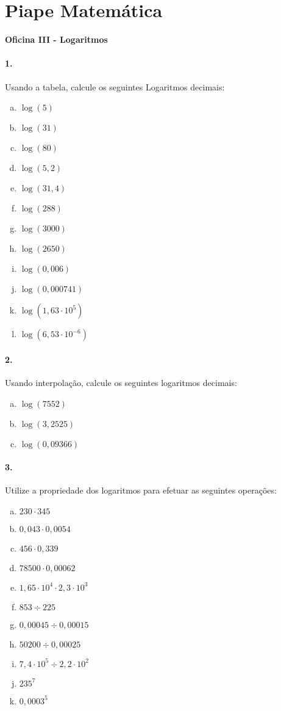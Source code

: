 \documentclass[a4paper,12pt]{article}
\begin{document}
 
  
\section*{Piape Matemática} 
\textbf{Oficina III - Logaritmos}    

\begin{multicols}{2} 
 
\paragraph*{1.} Usando a tabela, calcule os seguintes Logaritmos decimais:
\begin{enumerate}[a)]
\item $\log(5)$
\item  $\log(31)$
\item $\log(80)$
\item $\log(5,\!2)$
\item $\log(31,\!4)$
\item $\log(288)$
\item $\log(3000)$
\item $\log(2650)$
\item $\log(0,\!006)$
\item $\log(0,\!000741)$
\item $\log(1,\!63\cdot 10^{5})$
\item $\log(6,\!53\cdot 10^{-6})$
\end{enumerate}

\paragraph*{2.}  Usando interpolação, calcule os seguintes logaritmos decimais:
\begin{enumerate}[a)]
\item $\log(7552)$
\item $\log(3,\!2525)$
\item $\log(0,\!09366)$
\end{enumerate}

\paragraph*{3.} Utilize a propriedade dos logaritmos para efetuar as seguintes operações:

\begin{enumerate}[a)]
    \item $230\cdot 345$
    \item $0,\!043\cdot 0,\!0054$
    \item $456\cdot 0,\!339$
    \item $78500\cdot 0,\!00062$
    \item $1,65\cdot 10^{4}\cdot 2,3\cdot 10^{3}$
    \item $853\div 225$
    \item $0,\!00045\div 0,\!00015$
    \item $50200\div 0,\!00025$
    \item $7,4\cdot 10^{5}\div 2,2\cdot 10^{2}$
    \item $235^7$
    \item $0,\!0003^5$
\end{enumerate}



\end{multicols}
\end{document}
